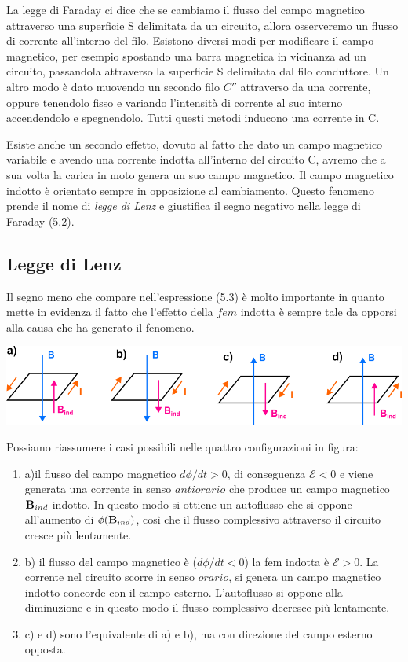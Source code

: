 \noindent La legge di Faraday ci dice che se cambiamo il flusso del campo magnetico attraverso una superficie S delimitata da un circuito, allora osserveremo un flusso di corrente all'interno del filo. Esistono diversi modi per modificare il campo magnetico, per esempio spostando una barra magnetica in vicinanza ad un circuito, passandola attraverso la superficie S delimitata dal filo conduttore. Un altro modo \`e dato muovendo un secondo filo $C''$ attraverso da una corrente, oppure tenendolo fisso e variando l'intensit\`a di corrente al suo interno accendendolo e spegnendolo. Tutti questi metodi inducono una corrente in C.
\newline

Esiste anche un secondo effetto, dovuto al fatto che dato un campo magnetico variabile e avendo una corrente indotta all'interno del circuito C, avremo che a sua volta la carica in moto genera un suo campo magnetico. Il campo magnetico indotto \`e orientato sempre in opposizione al cambiamento. Questo fenomeno prende il nome di \textit{legge di Lenz} e giustifica il segno negativo nella legge di Faraday (5.2). 

\subsection{Legge di Lenz}

 Il segno meno che compare nell'espressione (5.3) \`e molto importante in quanto mette in evidenza il fatto che l'effetto della $fem$ indotta \`e sempre tale da opporsi alla causa che ha generato il fenomeno.
\begin{center}
	\includegraphics[width = 15cm]{images/lenz_law1}
\end{center}
Possiamo riassumere i casi possibili nelle quattro configurazioni in figura:
\begin{enumerate}
	\item a)il flusso del campo magnetico $d\phi/dt >0 $, di conseguenza $\mathcal{E} <0$ e viene generata una corrente in senso $antiorario$ che produce un campo magnetico $\bold{B} _{ind}$ indotto. In questo modo si ottiene un autoflusso che si oppone all'aumento di $\phi(\bold{B}_{ind})$, cos\`i che il flusso complessivo attraverso il circuito cresce  pi\`u lentamente.
	\item b) il flusso del campo magnetico \`e ($d\phi/ dt < 0 $) la fem indotta \`e $\mathcal{E} > 0$. La corrente nel circuito scorre in senso $orario$, si genera un campo magnetico indotto concorde con il campo esterno. L'autoflusso si oppone alla diminuzione e in questo modo il flusso complessivo decresce pi\`u lentamente.
	\item c) e d) sono l'equivalente di a) e b), ma con direzione del campo esterno opposta. 
\end{enumerate}
